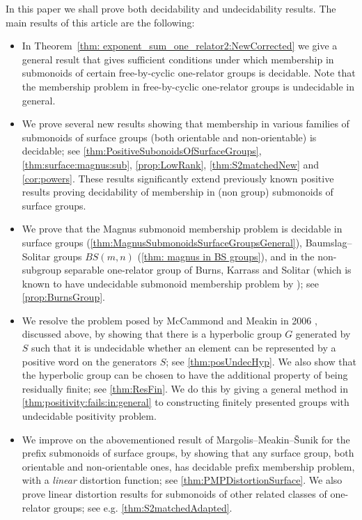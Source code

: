 \documentclass[11pt]{amsart}
\theoremstyle{plain}
\theoremstyle{definition}
\begin{document}
In this paper we shall prove both decidability and undecidability results. The main results of this article are the following:  
\begin{itemize} 
\item
In Theorem~\ref{thm: exponent_sum_one_relator2:NewCorrected} we give a general result that gives sufficient conditions under which membership in submonoids of certain free-by-cyclic one-relator groups is decidable.
Note that the membership problem in free-by-cyclic one-relator groups is undecidable in general.
\item 
We prove several new results showing that membership in various families of submonoids of surface groups (both orientable and non-orientable) is decidable; see 
\cref{thm:PositiveSubonoidsOfSurfaceGroups},
\cref{thm:surface:magnus:sub},
\cref{prop:LowRank},
\cref{thm:S2matchedNew} and
\cref{cor:powers}. 
These results significantly extend previously known positive results proving decidability of membership in (non group) submonoids of surface groups.
\item
We prove that the Magnus submonoid membership problem is decidable in surface groups (\cref{thm:MagnusSubmonoidsSurfaceGroupsGeneral}), Baumslag--Solitar groups $BS(m,n)$ (\cref{thm: magnus in BS groups}), and in the non-subgroup separable one-relator group of Burns, Karrass and Solitar 
\cite{Burns1987} (which is known to have undecidable submonoid membership problem by \cite{gray2020undecidability}); see \cref{prop:BurnsGroup}.
\item  
We resolve the problem posed by McCammond and Meakin in 2006 \cite[Problem~1]{McCammondMeakin}, discussed above, by showing that there is a hyperbolic group $G$ generated by $S$ such that it is undecidable whether an element can be represented by a positive word on the generators $S$; see \cref{thm:posUndecHyp}. We also show that the hyperbolic group can be chosen to have the additional property of being residually finite; see \cref{thm:ResFin}.
We do this by giving a general 
method in \cref{thm:positivity:fails:in:general} 
to constructing finitely presented groups with undecidable positivity problem. 
\item We improve on the abovementioned result of Margolis--Meakin--\v{S}unik for the prefix submonoids of surface groups, by showing that any surface group, both orientable and non-orientable ones, has decidable prefix membership problem, with a \emph{linear} distortion function; see \cref{thm:PMPDistortionSurface}.
We also prove linear distortion results for submonoids of other related classes of one-relator groups; see e.g. \cref{thm:S2matchedAdapted}. 

\end{itemize}
\end{document}
